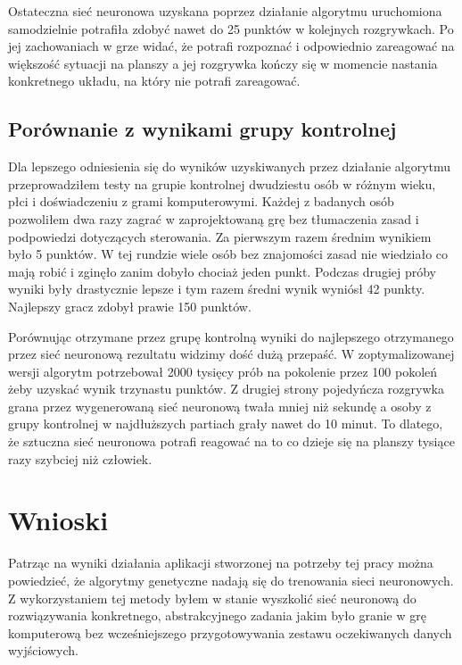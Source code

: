 \documentclass[12pt, oneside, a4paper]{report}
\begin{document}
Ostateczna sieć neuronowa uzyskana poprzez działanie algorytmu uruchomiona samodzielnie potrafiła zdobyć nawet do 25 punktów w kolejnych rozgrywkach. Po jej zachowaniach w grze widać, że potrafi rozpoznać i odpowiednio zareagować na większość sytuacji na planszy a jej rozgrywka kończy się w momencie nastania konkretnego układu, na który nie potrafi zareagować.

\section{Porównanie z wynikami grupy kontrolnej}

Dla lepszego odniesienia się do wyników uzyskiwanych przez działanie algorytmu przeprowadziłem testy na grupie kontrolnej dwudziestu osób w różnym wieku, płci i doświadczeniu z grami komputerowymi. Każdej z badanych osób pozwoliłem dwa razy zagrać w zaprojektowaną grę bez tłumaczenia zasad i podpowiedzi dotyczących sterowania. Za pierwszym razem średnim wynikiem było 5 punktów. W tej rundzie wiele osób bez znajomości zasad nie wiedziało co mają robić i zginęło zanim dobyło chociaż jeden punkt. Podczas drugiej próby wyniki były drastycznie lepsze i tym razem średni wynik wyniósł 42 punkty. Najlepszy gracz zdobył prawie 150 punktów. 

Porównując otrzymane przez grupę kontrolną wyniki do najlepszego otrzymanego przez sieć neuronową rezultatu widzimy dość dużą przepaść. W zoptymalizowanej wersji algorytm potrzebował 2000 tysięcy prób na pokolenie przez 100 pokoleń żeby uzyskać wynik trzynastu punktów. Z drugiej strony pojedyńcza rozgrywka grana przez wygenerowaną sieć neuronową twała mniej niż sekundę a osoby z grupy kontrolnej w najdłuższych partiach grały nawet do 10 minut. To dlatego, że sztuczna sieć neuronowa potrafi reagować na to co dzieje się na planszy tysiące razy szybciej niż człowiek. 


 

\chapter{Wnioski}

Patrząc na wyniki działania aplikacji stworzonej na potrzeby tej pracy można powiedzieć, że algorytmy genetyczne nadają się do trenowania sieci neuronowych. Z wykorzystaniem tej metody byłem w stanie wyszkolić sieć neuronową do rozwiązywania konkretnego, abstrakcyjnego zadania jakim było granie w grę komputerową bez wcześniejszego przygotowywania zestawu oczekiwanych danych wyjściowych.
\end{document}
